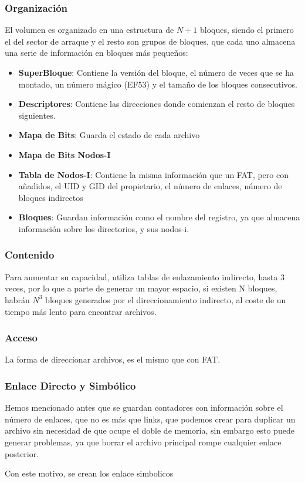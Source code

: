 \subsubsection{Organización}
El volumen es organizado en una estructura de \(N + 1\) bloques, siendo el primero el del sector de arraque y el resto son grupos de bloques, que cada uno almacena una serie de información en bloques más pequeños:
\begin{itemize}
        \item \textbf{SuperBloque}: Contiene la versión del bloque, el número de veces que se ha montado, un número mágico (EF53) y el tamaño de los bloques consecutivos.
        \item \textbf{Descriptores}: Contiene las direcciones donde comienzan el resto de bloques siguientes.
        \item \textbf{Mapa de Bits}: Guarda el estado de cada archivo
        \item \textbf{Mapa de Bits Nodos-I}
        \item \textbf{Tabla de Nodos-I}: Contiene la misma información que un FAT, pero con añadidos, el UID y GID del propietario, el número de enlaces, número de bloques indirectos
        \item \textbf{Bloques}: Guardan información como el nombre del registro, ya que almacena información sobre los directorios, y sus nodos-i.
\end{itemize}
\subsubsection{Contenido}
Para aumentar su capacidad, utiliza tablas de enlazamiento indirecto, hasta 3 veces, por lo que a parte de generar un mayor espacio, si existen N bloques, habrán \(N^3\) bloques generados por el direccionamiento indirecto, al coste de un tiempo más lento para encontrar archivos.

\subsubsection{Acceso}
La forma de direccionar archivos, es el mismo que con FAT.
\subsubsection{Enlace Directo y Simbólico}
Hemos mencionado antes que se guardan contadores con información sobre el número de enlaces, que no es más que links, que podemos crear para duplicar un archivo sin necesidad de que ocupe el doble de memoria, sin embargo esto puede generar problemas, ya que borrar el archivo principal rompe cualquier enlace posterior.
\par  Con este motivo, se crean los enlace simbolicos
